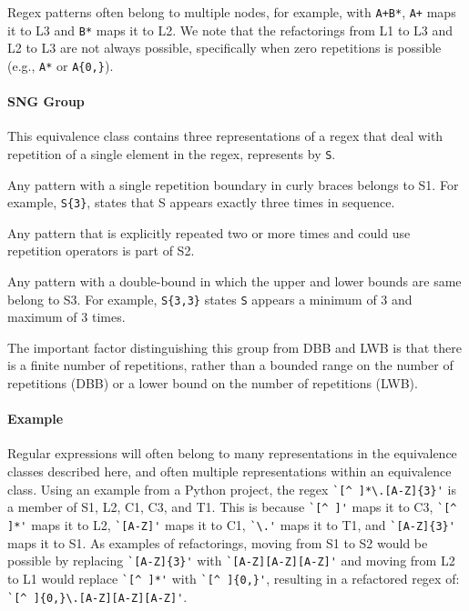 Regex patterns often belong to multiple nodes, for example, with \verb!A+B*!,  \verb!A+! maps it to L3 and \verb!B*! maps it to L2. We note that the refactorings from L1 to L3 and L2 to L3 are not always possible, specifically when zero repetitions is possible (e.g., \verb!A*! or \verb!A{0,}!).

\paragraph{SNG Group} This equivalence class contains  three representations of a regex that  deal with repetition of a single element in the regex, represents by \verb!S!.

\begin{description}  \itemsep -1pt
\item[S1:] Any pattern with a single repetition boundary in curly braces belongs to S1. For example,   \verb!S{3}!, states that S appears exactly three times in sequence.
\item[S2:] Any pattern that is explicitly repeated two or more times and could use repetition operators is part of S2.
\item[S3:] Any pattern with a double-bound in which the upper and lower bounds are same belong to S3. For example, \verb!S{3,3}! states \verb!S! appears a minimum of 3 and maximum of 3 times.
\end{description}

The important factor distinguishing this group from DBB and LWB is that there is a finite number of repetitions, rather than a bounded range on the number of repetitions (DBB) or a lower bound on the number of repetitions (LWB).

\paragraph{Example}
Regular expressions will often belong to many representations in the equivalence classes described here, and often multiple representations within an equivalence class.
Using an example from a Python project, the regex \verb!`[^ ]*\.[A-Z]{3}'! is a member of S1, L2, C1, C3, and T1. This is because \verb!`[^ ]'! maps it to C3, \verb!`[^ ]*'! maps it to L2, \verb!`[A-Z]'! maps it to C1, \verb!`\.'! maps it to T1, and \verb!`[A-Z]{3}'! maps it to S1. 
As examples of refactorings, moving from S1 to S2 would be possible by replacing  \verb!`[A-Z]{3}'! with  \verb!`[A-Z][A-Z][A-Z]'! and moving from L2 to L1 would replace \verb!`[^ ]*'! with \verb!`[^ ]{0,}'!, resulting in a refactored regex of:  \verb!`[^ ]{0,}\.[A-Z][A-Z][A-Z]'!.

